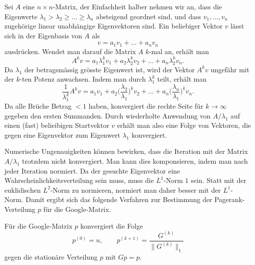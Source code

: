 Sei $A$ eine $n\times n$-Matrix, der Einfachheit halber nehmen wir an,
dass die Eigenwerte $\lambda_1>\lambda_2\ge \dots\ge \lambda_n$
absteigend geordnet sind,
und dass $v_1,\dots,v_n$ zugehörige linear unabhängige Eigenvektoren sind.
Ein beliebiger Vektor $v$ lässt sich in der Eigenbasis von $A$
als
\[
v = a_1v_1+\dots+a_nv_n
\]
ausdrücken.
Wendet man darauf die Matrix $A$ $k$-mal an, erhält man
\[
A^kv
=
a_1\lambda_1^k v_1 
+
a_2\lambda_2^k v_2
+
\dots
+
a_n\lambda_2^k v_n.
\]
Da $\lambda_1$ der betragsmässig grösste Eigenwert ist, wird der Vektor
$A^kv$ ungefähr mit der $k$-ten Potenz anwachsen.
Indem man durch $\lambda_1^k$ teilt, erhält man
\[
\frac{1}{\lambda_1^k} A^k v
=
a_1v_1
+
a_2\biggl(\frac{\lambda_2}{\lambda_1}\biggr)^k v_2
+
\dots
+
a_n\biggl(\frac{\lambda_n}{\lambda_1}\biggr)^k v_n.
\]
Da alle Brüche Betrag $<1$ haben, konvergiert die rechte Seite für $k\to\infty$
gegeben den  ersten Summanden.
Durch wiederholte Anwendung von $A/\lambda_1$ auf einen (fast) belieibigen
Startvektor $v$ erhält man also eine Folge von Vektoren, die gegen eine
Eigenvektor zum Eigenwert $\lambda_1$ konvergiert.

Numerische Ungenauigkeiten können bewirken, dass die Iteration mit der
Matrix $A/\lambda_1$ trotzdem nicht konvergiert.
Man kann dies komponsieren, indem man nach jeder Iteration normiert.
Da der gesuchte Eigenvektor eine Wahrscheinlichkeitsverteilung sein muss,
muss die $L^1$-Norm $1$ sein.
Statt mit der euklidischen $L^2$-Norm zu normieren, normiert man daher
besser mit der $L^1$-Norm.
Damit ergibt sich das folgende Verfahren zur Bestimmung der Pagerank-Verteilung
$p$ für die Google-Matrix.

\begin{satz}
Für die Google-Matrix $p$ konvergiert die Folge 
\[
p^{(0)} = u,
\qquad
p^{(k+1)} = \frac{G^{(k)}}{\| G^{(k)} \|_1}
\]
gegen die stationäre Verteilung $p$ mit $Gp=p$.
\end{satz}



